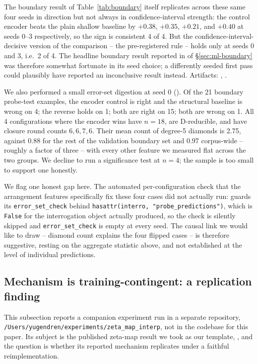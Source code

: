 The boundary result of Table~\ref{tab:boundary} itself replicates across
these same four seeds in direction but not always in confidence-interval
strength: the control encoder beats the plain shallow baseline by $+0.38$,
$+0.35$, $+0.21$, and $+0.40$ at seeds 0--3 respectively, so the sign is
consistent 4 of 4. But the confidence-interval-decisive version of the
comparison -- the pre-registered rule -- holds only at seeds 0 and 3, i.e.\
2 of 4. The headline boundary result reported in
of \S\ref{sec:ml-boundary} was therefore somewhat fortunate in its seed choice;
a differently seeded first pass could plausibly have reported an
inconclusive result instead. Artifacts:
,
.

We also performed a small error-set digestion at seed 0
(). Of the 21 boundary probe-test
examples, the encoder control is right and the structural baseline is
wrong on 4; the reverse holds on 1; both are right on 15; both are wrong
on 1. All 4 configurations where the encoder wins have $n=18$, are
D-reducible, and have closure round counts $6, 6, 7, 6$. Their mean count
of degree-5 diamonds is 2.75, against 0.88 for the rest of the validation
boundary set and 0.97 corpus-wide -- roughly a factor of three -- with
every other feature we measured flat across the two groups. We decline to
run a significance test at $n=4$; the sample is too small to support one
honestly.

We flag one honest gap here. The automated per-configuration check that
the arrangement features specifically fix these four cases did not
actually run: \art{tools/d1v2\_extraction\_test.py} guards its
\texttt{error\_set\_check} behind
\texttt{hasattr(interro, "probe\_predictions")}, which is \texttt{False}
for the interrogation object actually produced, so the check is silently
skipped and \texttt{error\_set\_check} is empty at every seed. The causal
link we would like to draw -- diamond count explains the four flipped
cases -- is therefore suggestive, resting on the aggregate statistic above,
and not established at the level of individual predictions.

\subsection{Mechanism is training-contingent: a replication finding}

This subsection reports a companion experiment run in a separate
repository, \texttt{/Users/yugendren/experiments/zeta\_map\_interp}, not in
the codebase for this paper. Its subject is the published zeta-map result
we took as our template, \cite{huang2025zeta}, and the question is whether
its reported mechanism replicates under a faithful reimplementation.

